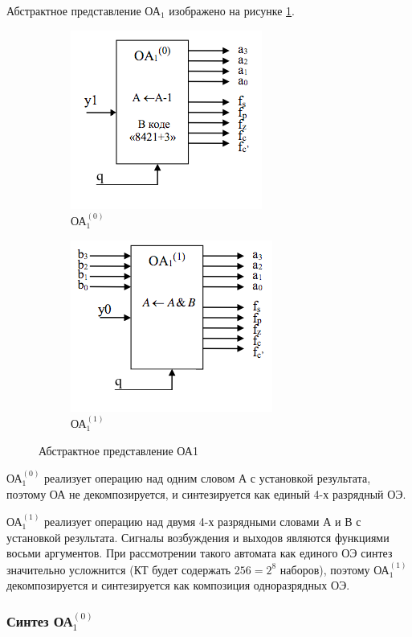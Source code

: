 Абстрактное представление ОА$_1$ изображено на рисунке \ref{figure:abs_oa1}.

\begin{figure}[H]
	\begin{subfigure}[b]{0.3\textwidth}
		\includegraphics[scale=0.7]{images/abs10.png}
		\caption{ОА$^{(0)}_{1}$}
	\end{subfigure}
	\qquad
	\begin{subfigure}[b]{0.3\textwidth}
		\includegraphics[scale=0.7]{images/abs11.png}
		\caption{ОА$^{(1)}_{1}$}
	\end{subfigure}
	\caption{Абстрактное представление ОА1}
	\label{figure:abs_oa1}
\end{figure}

ОА$^{(0)}_{1}$ реализует операцию над одним словом $А$ с установкой результата, поэтому ОА не декомпозируется, и синтезируется как единый 4-х разрядный ОЭ.

ОА$^{(1)}_{1}$ реализует операцию над двумя 4-х разрядными словами $А$ и $В$ с установкой результата. Сигналы возбуждения и выходов являются функциями восьми аргументов. При рассмотрении такого автомата как единого ОЭ синтез значительно усложнится (КТ будет содержать $256 = 2^8$ наборов), поэтому ОА$^{(1)}_{1}$ декомпозируется и синтезируется как композиция одноразрядных ОЭ.


\subsubsection{Синтез ОА$^{(0)}_{1}$}

